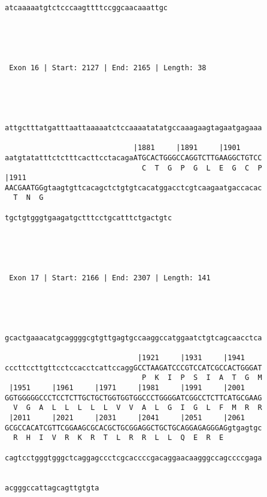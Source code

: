 \documentclass{article}
\begin{document}
\begin{Verbatim}
atcaaaaatgtctcccaagttttccggcaacaaattgc
                                      




 Exon 16 | Start: 2127 | End: 2165 | Length: 38 




                                                            
attgctttatgatttaattaaaaatctccaaaatatatgccaaagaagtagaatgagaaa
                                                            
                              |1881     |1891     |1901     
aatgtatatttctctttcacttcctacagaATGCACTGGGCCAGGTCTTGAAGGCTGTCC
                                C  T  G  P  G  L  E  G  C  P
|1911                                                       
AACGAATGGgtaagtgttcacagctctgtgtcacatggacctcgtcaagaatgaccacac
  T  N  G                                                   
                                       
tgctgtgggtgaagatgctttcctgcatttctgactgtc
                                       




 Exon 17 | Start: 2166 | End: 2307 | Length: 141 




                                                            
gcactgaaacatgcaggggcgtgttgagtgccaaggccatggaatctgtcagcaacctca
                                                            
                               |1921     |1931     |1941    
cccttccttgttcctccacctcattccaggGCCTAAGATCCCGTCCATCGCCACTGGGAT
                                P  K  I  P  S  I  A  T  G  M
 |1951     |1961     |1971     |1981     |1991     |2001    
GGTGGGGGCCCTCCTCTTGCTGCTGGTGGTGGCCCTGGGGATCGGCCTCTTCATGCGAAG
  V  G  A  L  L  L  L  L  V  V  A  L  G  I  G  L  F  M  R  R
 |2011     |2021     |2031     |2041     |2051     |2061    
GCGCCACATCGTTCGGAAGCGCACGCTGCGGAGGCTGCTGCAGGAGAGGGAGgtgagtgc
  R  H  I  V  R  K  R  T  L  R  R  L  L  Q  E  R  E         
                                                            
cagtcctgggtgggctcaggagccctcgcaccccgacaggaacaagggccagccccgaga
                                                            
                      
acgggccattagcagttgtgta
                      





\end{Verbatim}
\end{document}
